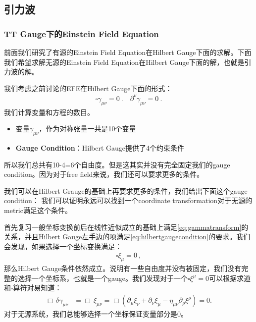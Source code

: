 \subsection{引力波}
\subsubsection{TT Gauge下的Einstein Field Equation}

前面我们研究了有源的Einstein Field Equation在Hilbert Gauge下面的求解。下面我们希望求解无源的Einstein Field Equation在Hilbert Gauge下面的解，也就是引力波的解。

\bigskip
{}

我们考虑之前讨论的EFE在Hilbert Gauge下面的形式：
\begin{align}
  \square\gamma_{\mu\nu}=0\mathrm{~.} \quad \partial^\nu \gamma_{\mu\nu}=0\mathrm{~.}
\end{align}
我们计算变量和方程的数目。
\begin{itemize}
  \item 变量$ \gamma_{\mu\nu} $，作为对称张量一共是10个变量
  \item \textbf{Gauge Condition}：Hilbert Gauge提供了4个约束条件
\end{itemize}
所以我们总共有10-4=6个自由度。但是这其实并没有完全固定我们的gauge condition。因为对于free field来说，我们还可以要求更多的条件。


\bigskip
{}

我们可以在Hilbert Grauge的基础上再要求更多的条件，我们给出下面这个gauge condition：
我们可以证明永远可以找到一个coordinate transformation对于无源的metric满足这个条件。

\bigskip
{}


首先复习一般坐标变换前后在线性近似成立的基础上满足\cref{eq:gammatransform}的关系，并且Hilbert Gauge左手边的项满足\cref{eq:hilbertgaugecondition}的要求。我们会发现，如果选择一个坐标变换满足：
\begin{align}
  \square\xi_\mu = 0\mathrm{~,}
\end{align}
那么Hilbert Gauge条件依然成立。说明有一些自由度并没有被固定，我们没有完整的选择一个坐标系，也就是一个gauge。我们发现对于一个$ \square \xi^\mu = 0 $可以根据求道和$ \square $算符对易知道：
\begin{align}
  \Box\, \delta\gamma_{\mu\nu} 
    &= \Box\, \xi_{\mu\nu} 
     = \Box\!\left( \partial_\mu \xi_\nu + \partial_\nu \xi_\mu 
       - \eta_{\mu\nu} \partial_\rho \xi^\rho \right)
     = 0 .
\end{align}
对于无源系统，我们总能够选择一个坐标保证变量部分是0。

